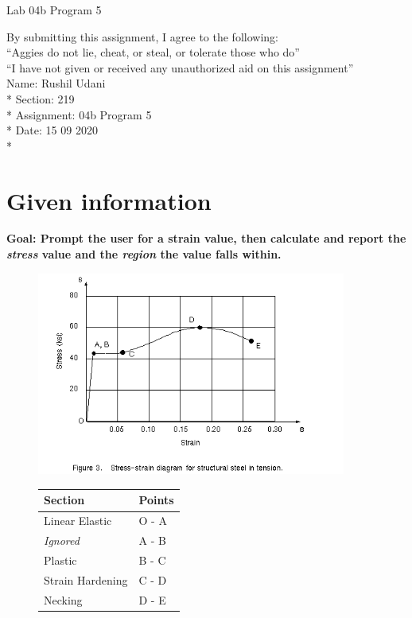 \documentclass{article}
\begin{document}
{\Large Lab 04b Program 5}
\vspace{0.25in}

\noindent
By submitting this assignment, I agree to the following: \\
 ``Aggies do not lie, cheat, or steal, or tolerate those who do'' \\
 ``I have not given or received any unauthorized aid on this assignment'' \\

\noindent
Name:        Rushil Udani \\*
Section:     219 \\*
Assignment:  04b Program 5 \\*
Date:        15 09 2020 \\*

\hrulefill

\section*{Given information}

\textbf{Goal: Prompt the user for a strain value, then calculate and report the \textit{stress} value and the \textit{region} the value falls within.}

\begin{figure}[h]
	\begin{minipage}[c]{0.45\linewidth}
		\centering
		\includegraphics[width=4in]{streb.png}
	\end{minipage}
	\hfill
	\begin{minipage}[c]{0.45\linewidth}
		\centering
		\begin{tabular}{l||l}
			Section & Points \\ \hline
			Linear Elastic & O - A \\
			\textit{Ignored} & A - B \\
			Plastic & B - C \\
			Strain Hardening & C - D \\
			Necking & D - E \\
		\end{tabular}
	\end{minipage}
\end{figure}
\end{document}
